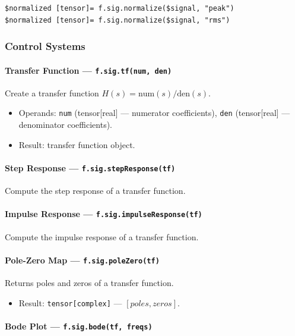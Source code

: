 \begin{verbatim}
$normalized [tensor]= f.sig.normalize($signal, "peak")
$normalized [tensor]= f.sig.normalize($signal, "rms")
\end{verbatim}

\subsubsection{Control Systems}

\paragraph{Transfer Function --- \texttt{f.sig.tf(num, den)}}
Create a transfer function $H(s) = \text{num}(s) / \text{den}(s)$.

\begin{itemize}
\item Operands: \texttt{num} (tensor[real] --- numerator coefficients), \texttt{den} (tensor[real] --- denominator coefficients).
\item Result: transfer function object.
\end{itemize}

\paragraph{Step Response --- \texttt{f.sig.stepResponse(tf)}}
Compute the step response of a transfer function.

\paragraph{Impulse Response --- \texttt{f.sig.impulseResponse(tf)}}
Compute the impulse response of a transfer function.

\paragraph{Pole-Zero Map --- \texttt{f.sig.poleZero(tf)}}
Returns poles and zeros of a transfer function.

\begin{itemize}
\item Result: \texttt{tensor[complex]} --- $[poles, zeros]$.
\end{itemize}

\paragraph{Bode Plot --- \texttt{f.sig.bode(tf, freqs)}}

